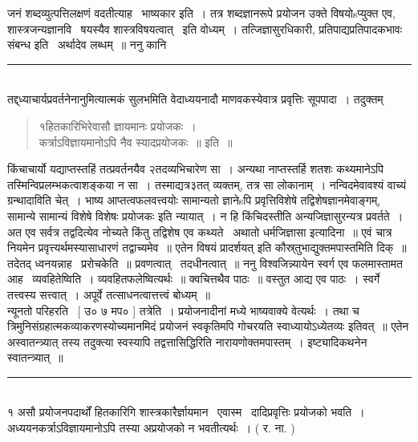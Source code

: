 \documentclass[11pt, openany]{book}
\begin{document}
\begin{multicols}{2}
\noindent
जनं शब्दव्युत्पत्तिलक्षणं वदतीत्याह \textendash\ भाष्यकार इति~। तत्र शब्दज्ञानरूपे प्रयोजन उक्ते विषयोsप्युक्त एव, शास्त्रजन्यज्ञानवि \textendash\ षयस्यैव शास्त्रविषयत्वात् \textendash\ इति वोध्यम्~। तत्जिज्ञासुरधिकारी, प्रतिपाद्यप्रतिपादकभावः संबन्ध इति \textendash\ अर्थादेव लब्धम्~॥ ननु कानि

\noindent
\rule{1\linewidth}{0.5pt}\\

\noindent
तद्द्ध्याचार्यप्रवर्तनेनानुमित्यात्मकं सुलभमिति वेदाध्ययनादौ माणवकस्येवात्र प्रवृत्तिः सूपपादा~। तदुक्तम् \textendash\ 

\begin{quote}
{\qt १हितकारिभिरेवासौ ज्ञायमानः प्रयोजकः~।\\
कर्त्राऽविज्ञायमानोऽपि नैव स्यादप्रयोजकः~॥} इति~॥
\end{quote}

किंचाचार्यो यद्याप्तस्तहिं तत्प्रवर्तनयैव २तदव्यभिचारेण सा~। अन्यथा नाप्तस्तर्हि शतशः कथ्यमानेऽपि तस्मिन्विप्रलम्भकत्वाशङ्कया न सा~। तस्माद्यत्र३तत् व्यक्तम्, तत्र सा लोकानाम्~। नन्विदमेवावश्यं वाच्यं ग्रन्थादाविति चेत्~। भाष्य आप्तत्वफलवत्त्वयोः सामान्यतो ज्ञानेsपि प्रवृत्तिविशेषे तद्विशेषज्ञानमेवाङ्गम्, {\qt सामान्ये सामान्यं विशेषे विशेषः प्रयोजकः} इति न्यायात्~। न हि किंचिदस्तीति अन्यजिज्ञासुरन्यत्र प्रवर्तते~। अत एव सर्वत्र तद्वदित्येव नोच्यते किंतु तद्विशेष एव कथ्यते \textendash\ {\qt अथातो धर्मजिज्ञासा} इत्यादिना~॥ एवं चात्र नियमेन प्रवृत्त्यर्थमस्यासाधारणं तद्वाच्यमेव~॥ एतेन {\qt विषयं प्रादर्शयत्} इति कौस्र्तुभाद्युक्तमपास्तमिति दिक्~॥ तदेतद् ध्वनयन्नाह \textendash\ प्ररोचकेति~॥ प्रवणत्वात् \textendash\ तदधीनत्वात्~॥ ननु विश्वजिन्न्यायेन स्वर्ग एव फलमास्तामत आह \textendash\ व्यवहितेष्विति~। व्यवहितफलेष्वित्यर्थः~॥ क्वचित्तथैव पाठः~॥ वस्तुत आद्य एव पाठः~। स्वर्गे तत्त्वस्य सत्त्वात्~। अपूर्वे तत्साधनत्वात्तत्त्वं बोध्यम्~॥\\

न्यूनतो परिहरति \textendash\ [ उ० ७ मप० ] तत्रेति~। प्रयोजनादीनां मध्ये भाष्यवाक्ये वेत्यर्थः~। तथा च त्रिमुनिसंग्रहात्मकव्याकरणस्योच्यमानमिदं प्रयोजनं स्वकृतिमपि गोचरयति {\qt स्वाध्यायोऽध्येतव्यः} इतिवत्~॥ एतेन अस्वातन्त्र्यात् तस्य तदुक्त्या स्वस्यापि तद्वत्तासिद्धिरिति नारायणोक्तमपास्तम्~। इष्ट्यादिकथनेन स्वातन्त्र्यात्~॥

\noindent
\rule{1\linewidth}{0.5pt}\\

१ असौ प्रयोजनपदार्थों हितकारिगि शास्त्रकारैर्ज्ञायमान \textendash\ एवास्म \textendash\ दादिप्रवृत्तिः प्रयोजको भवति~। अध्ययनकर्त्राऽविज्ञायमानोऽपि तस्या अप्रयोजको न भवतीत्यर्थः~। ( र. ना. ) 


\end{multicols}
\end{document}
